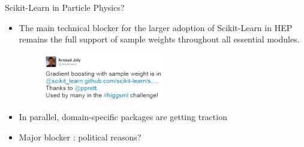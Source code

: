 \documentclass{beamer}
\begin{document}
\begin{frame}{Scikit-Learn in Particle Physics?}

\begin{itemize}
\item The main technical blocker for the larger adoption of Scikit-Learn in HEP remains the {\color{red} full support of sample weights} throughout
      all essential modules.


        \begin{figure}
        \includegraphics[width=0.5\textwidth]{./figures/sw.png}
        \end{figure}

\item In parallel, domain-specific packages are getting traction


\item Major blocker : political reasons?

\end{itemize}

\end{frame}

\end{document}

